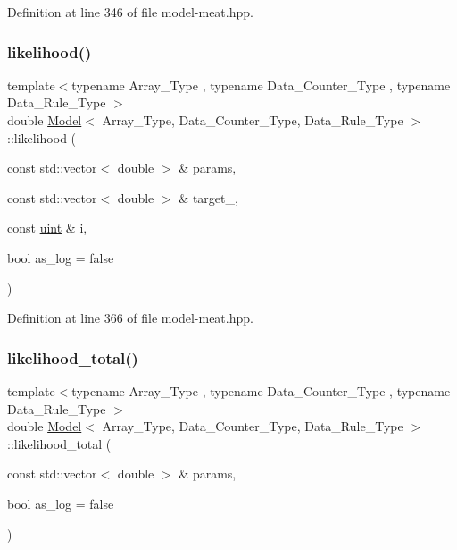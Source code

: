 Definition at line 346 of file model-\/meat.\+hpp.

\mbox{\label{class_model_ab88f541fc010f0ee1a415c9cb6c292b7}} 
\subsubsection{\texorpdfstring{likelihood()}{likelihood()}\hspace{0.1cm}{\footnotesize\ttfamily [3/3]}}
{\footnotesize\ttfamily template$<$typename Array\+\_\+\+Type , typename Data\+\_\+\+Counter\+\_\+\+Type , typename Data\+\_\+\+Rule\+\_\+\+Type $>$ \\
double \hyperlink{class_model}{Model}$<$ Array\+\_\+\+Type, Data\+\_\+\+Counter\+\_\+\+Type, Data\+\_\+\+Rule\+\_\+\+Type $>$\+::likelihood (\begin{DoxyParamCaption}\item[{const std\+::vector$<$ double $>$ \&}]{params,  }\item[{const std\+::vector$<$ double $>$ \&}]{target\+\_\+,  }\item[{const \hyperlink{typedefs_8hpp_a91ad9478d81a7aaf2593e8d9c3d06a14}{uint} \&}]{i,  }\item[{bool}]{as\+\_\+log = {\ttfamily false} }\end{DoxyParamCaption})\hspace{0.3cm}{\ttfamily [inline]}}



Definition at line 366 of file model-\/meat.\+hpp.

\mbox{\label{class_model_a31d16ef478d772cedde0813575074a0f}} 
\subsubsection{\texorpdfstring{likelihood\+\_\+total()}{likelihood\_total()}}
{\footnotesize\ttfamily template$<$typename Array\+\_\+\+Type , typename Data\+\_\+\+Counter\+\_\+\+Type , typename Data\+\_\+\+Rule\+\_\+\+Type $>$ \\
double \hyperlink{class_model}{Model}$<$ Array\+\_\+\+Type, Data\+\_\+\+Counter\+\_\+\+Type, Data\+\_\+\+Rule\+\_\+\+Type $>$\+::likelihood\+\_\+total (\begin{DoxyParamCaption}\item[{const std\+::vector$<$ double $>$ \&}]{params,  }\item[{bool}]{as\+\_\+log = {\ttfamily false} }\end{DoxyParamCaption})\hspace{0.3cm}{\ttfamily [inline]}}



